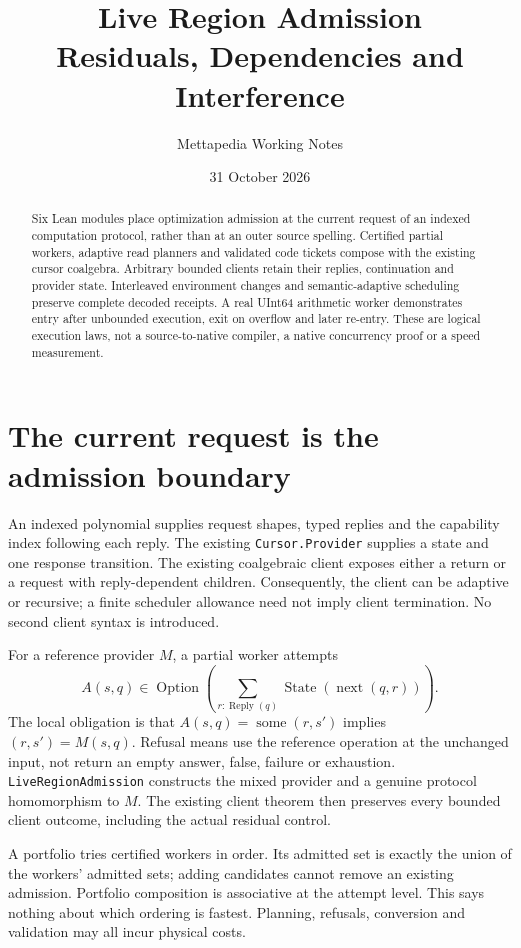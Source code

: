 \documentclass[11pt,a4paper]{article}
\title{Live Region Admission\\
  \large Residuals, Dependencies and Interference}
\author{Mettapedia Working Notes}
\date{31 October 2026}
\newcommand{\code}[1]{\nolinkurl{#1}}
\begin{document}
\maketitle

\begin{abstract}
Six Lean modules place optimization admission at the current request of an
indexed computation protocol, rather than at an outer source spelling.
Certified partial workers, adaptive read planners and validated code tickets
compose with the existing cursor coalgebra. Arbitrary bounded clients retain
their replies, continuation and provider state. Interleaved environment
changes and semantic-adaptive scheduling preserve complete decoded receipts.
A real UInt64 arithmetic worker demonstrates entry after unbounded execution,
exit on overflow and later re-entry. These are logical execution laws, not a
source-to-native compiler, a native concurrency proof or a speed measurement.
\end{abstract}

\section{The current request is the admission boundary}

An indexed polynomial supplies request shapes, typed replies and the capability
index following each reply. The existing \code{Cursor.Provider} supplies a
state and one response transition. The existing coalgebraic client exposes
either a return or a request with reply-dependent children. Consequently,
the client can be adaptive or recursive; a finite scheduler allowance need
not imply client termination. No second client syntax is introduced.

For a reference provider $M$, a partial worker attempts
\[
 A(s,q)\in\operatorname{Option}
   \left(\sum_{r:\operatorname{Reply}(q)}
                    \operatorname{State}(\operatorname{next}(q,r))\right).
\]
The local obligation is that $A(s,q)=\operatorname{some}(r,s')$ implies
$(r,s')=M(s,q)$. Refusal means use the reference operation at the unchanged
input, not return an empty answer, false, failure or exhaustion.
\code{LiveRegionAdmission} constructs the mixed provider and a genuine
protocol homomorphism to $M$. The existing client theorem then preserves
every bounded client outcome, including the actual residual control.

A portfolio tries certified workers in order. Its admitted set is exactly
the union of the workers' admitted sets; adding candidates cannot remove
an existing admission. Portfolio composition is associative at the attempt
level. This says nothing about which ordering is fastest. Planning, refusals,
conversion and validation may all incur physical costs.
\end{document}

